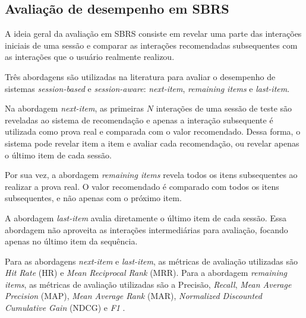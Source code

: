 
  \subsection{Avaliação de desempenho em SBRS} \label{chap:desempenho}
  A ideia geral da avaliação em SBRS consiste em revelar uma parte das interações
  iniciais de uma sessão e comparar as interações recomendadas subsequentes com
  as interações que o usuário realmente realizou.
  
  Três abordagens são utilizadas na literatura para avaliar o desempenho de
  sistemas \textit{session-based} e \textit{session-aware}: \textit{next-item},
  \textit{remaining items} e \textit{last-item}.

  Na abordagem \textit{next-item}, as primeiras $N$ interações de uma sessão de
  teste são reveladas ao sistema de recomendação e apenas a interação
  subsequente é utilizada como prova real e comparada com o valor recomendado.
  Dessa forma, o sistema pode revelar item a item e avaliar cada recomendação,
  ou revelar apenas o último item de cada sessão.

  Por sua vez, a abordagem \textit{remaining items} revela todos os itens
  subsequentes ao realizar a prova real. O valor recomendado é comparado
  com todos os itens subsequentes, e não apenas com o próximo item.

  A abordagem \textit{last-item} avalia diretamente o último item de cada
  sessão. Essa abordagem não aproveita as interações intermediárias para
  avaliação, focando apenas no último item da sequência.

   
    Para as abordagens \textit{next-item} e
  \textit{last-item}, as métricas de avaliação utilizadas são \textit{Hit Rate}
  (HR) e \textit{Mean Reciprocal Rank} (MRR). Para a abordagem \textit{remaining
  items}, as métricas de avaliação utilizadas são a Precisão, \textit{Recall},
  \textit{Mean Average Precision} (MAP), \textit{Mean Average Rank} (MAR),
  \textit{Normalized Discounted Cumulative Gain} (NDCG) e \textit{F1}
  \cite{sessionbaseddp}.

